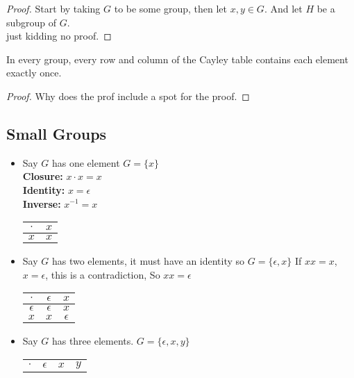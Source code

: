 \documentclass[openany]{report}
\begin{document}
\begin{proof}
    Start by taking $G$ to be some group, then let $x,y \in G$. And let $H$ be a subgroup of $G$.\\[5ex]
    just kidding no proof.
\end{proof}
\begin{prop}
    In every group, every row and column of the Cayley table contains each element exactly once.
\end{prop}
\begin{proof}
    Why does the prof include a spot for the proof.
\end{proof}
\subsection{Small Groups}
\begin{itemize}
    \item Say $G$ has one element $G = \{x\}$ \\
        \textbf{Closure:} $x \cdot x = x$\\
        \textbf{Identity:} $x = \epsilon$\\
        \textbf{Inverse:} $x^{-1} = x$
        \begin{center}
            \begin{tabular}{c|c}
            $\cdot$ & $x$\\
            \hline
               $x$  & $x$
            \end{tabular}
        \end{center}
    \item Say $G$ has two elements, it must have an identity so $G = \{\epsilon, x\}$ If $xx = x$, $x = \epsilon$, this is a contradiction,  So $xx = \epsilon$
    \begin{center}
        \begin{tabular}{c|cc}
            $\cdot$ & $\epsilon$ & $x$  \\
            \hline
            $\epsilon$ & $\epsilon$ & $x$\\
            $x$ & $x$ & $\epsilon$\\
        \end{tabular}
    \end{center}
    \item Say $G$ has three elements. $G = \{\epsilon, x, y\}$
    \begin{center}
        \begin{tabular}{c|ccc}
             $\cdot$ & $\epsilon$ & $x$ & $y$ \\

\end{tabular}
\end{center}
\end{itemize}
\end{document}
